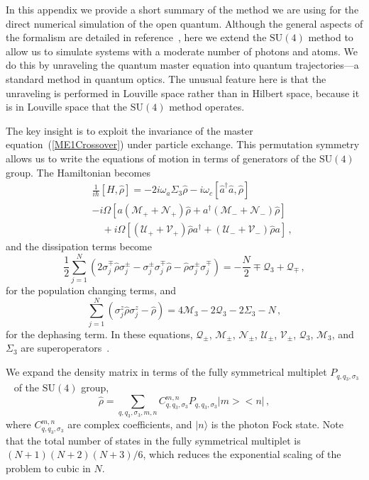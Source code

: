 \documentclass[aps,
twocolumn,
showpacs,
superscriptaddress,groupedaddress]{revtex4}
\begin{document}
In this appendix we provide a short summary of the method we are using
for the direct numerical simulation of the open quantum.  Although the
general aspects of the formalism are detailed in
reference~\cite{PhysRevA.87.062101}, here we extend the $\mathrm{SU}(4)$
method to allow us to simulate systems with a moderate number of photons
and atoms.  We do this by unraveling the quantum master equation into
quantum trajectories---a standard method in quantum optics.  The unusual
feature here is that the unraveling is performed in Louville space
rather than in Hilbert space, because it is in Louville space that the
$\mathrm{SU}(4)$ method operates.

The key insight is to exploit the invariance of the master
equation~(\ref{ME1Crossover}) under particle exchange.  This permutation
symmetry allows us to write the equations of motion in terms of
generators of the $\mathrm{SU}(4)$ group.  The Hamiltonian becomes
\begin{eqnarray}
  &&\frac{1}{i\hbar}[H,\hat{\rho}]=
  -2i \omega_a \Sigma_3\hat{\rho} -i\omega_c [ \hat{a}^{\dagger}\hat{a}, \hat{\rho}]
  \nonumber
  \\
  &&-i\Omega \left[a(\mathcal{M}_++\mathcal{N}_+)\hat{\rho}+a^\dagger
    (\mathcal{M}_-+\mathcal{N}_-)\hat{\rho}\right]\nonumber\\
  &&\quad{}+i\Omega\left[(\mathcal{U}_++\mathcal{V}_+)\hat{\rho} a^\dagger
    +(\mathcal{U}_-+\mathcal{V}_-)\hat{\rho} a\right]\,,
\end{eqnarray}
and the dissipation terms become
\begin{equation}
  \frac12\sum_{j=1}^N(
   2\sigma_j^{\mp}\hat{\rho}\sigma_j^{\pm}-\sigma_j^{\pm} \sigma_j^{\mp}\hat{\rho}-
   \hat{\rho} \sigma_j^{\pm}\sigma_j^{\mp}
  )=-\frac{N}{2}\mp
  \mathcal{Q}_3+\mathcal{Q}_{\mp}\,,
\end{equation}
for the population changing terms, and
\begin{equation}
\sum_{j=1}^N(\sigma_j^{z}\hat{\rho}\sigma_j^{z}-\hat{\rho})=4\mathcal{M}_3-2
  \mathcal{Q}_3-2\Sigma_3-N\,,
  \label{ham}
\end{equation}
for the dephasing term.  In these equations, $\mathcal{Q}_{\pm}$,
$\mathcal{M}_{\pm}$, $\mathcal{N}_{\pm}$, $\mathcal{U}_{\pm}$,
$\mathcal{V}_{\pm}$, $\mathcal{Q}_3$, $\mathcal{M}_3$, and $\Sigma_3$
are superoperators~\cite{PhysRevA.87.062101}.

We expand the density matrix in terms of the fully symmetrical multiplet
$P_{q,q_3,\sigma_3}$~\cite{PhysRevA.87.062101} of the $\mathrm{SU}(4)$ group,
\begin{equation}\label{ex}
  \hat{\rho}=\sum_{q,q_3,\sigma_3,m,n} C_{q,q_3,\sigma_3}^{m,n}
  P_{q,q_3,\sigma_3}\bigl|m\bigr>\bigl<n\bigr|\,,
\end{equation}
where $C_{q,q_3,\sigma_3}^{m,n}$ are complex coefficients, and
$|n\rangle$ is the photon Fock state. Note that the total number of
states in the fully symmetrical multiplet is $(N+1)(N+2)(N+3)/6$,
which reduces the exponential scaling of the problem to cubic in $N$.
\end{document}
